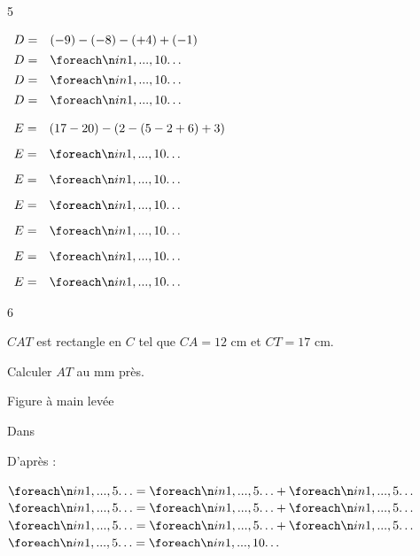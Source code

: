 \documentclass[a4paper]{book}
\begin{document}
{\begin{exerciceNote}{5}
\begin{minipage}{0.30\linewidth}
            $\begin{array}{ll}
                D = & (-9)-(-8)-(+4)+(-1) \\[1ex]
                D = & \points[10]\\[1ex]
                D = & \points[10]\\[1ex]
                D = & \points[10]
            \end{array}$
        \end{minipage}
        \hfill
        \begin{minipage}[t]{0.30\linewidth}
            $\begin{array}{ll}
                E = & (17-20)-(2-(5-2+6)+3) \\[2ex]
                E = & \points[10] \\[2ex]
                E = & \points[10] \\[2ex]
                E = & \points[10] \\[2ex]
                E = & \points[10] \\[2ex]
                E = & \points[10] \\[2ex]
                E = & \points[10]
            \end{array}$
        \end{minipage}
    \end{exerciceNote}


    \begin{exerciceNote}{6}
        \begin{minipage}{0.5\linewidth}
             $CAT$ est rectangle en $C$ tel que $CA = 12$ cm et $CT = 17$ cm. 
    
            Calculer $AT$ au mm près.
    
            \begin{center}
                \small{Figure à main levée}
                
            \end{center}
                
            Dans \points[18]
    
            \medskip
    
            D'après \points[15] :
    
            \medskip
    
            $\points[5] = \points[5]+\points[5]$ \\
            $\points[5] = \points[5]+\points[5]$ \\
            $\points[5] = \points[5]+\points[5]$ \\
            $\points[5] = \points[10]$ 
    

\end{minipage}
\end{exerciceNote}}
\end{document}
